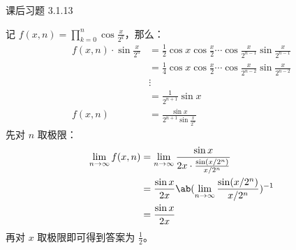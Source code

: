 \begin{problem}
	课后习题 3.1.13

	\begin{solution}
		记 $f(x,n) = \prod_{k=0}^n \cos \frac{x}{2^k}$，那么：
		$$
		\begin{aligned}
			f(x,n) \cdot \sin \frac{x}{2^n} & = \frac{1}{2} \cos x \cos \frac{x}{2} \cdots \cos \frac{x}{2^{n-1}} \sin \frac{x}{2^{n-1}} \\
			& = \frac{1}{4} \cos x \cos \frac{x}{2} \cdots \cos \frac{x}{2^{n-2}} \sin \frac{x}{2^{n-2}} \\
			& \vdots \\
			& = \frac{1}{2^{n+1}} \sin x \\
			f(x,n) & = \frac{\sin x}{2^{n+1} \sin \frac{x}{2^n}}
		\end{aligned}
		$$
		先对 $n$ 取极限：
		$$
		\begin{aligned}
			\lim_{n \to \infty} f(x,n) & = \lim_{n \to \infty} \frac{\sin x}{2x \cdot \frac{\sin (x / 2^n)}{x / 2^n}} \\
			& = \frac{\sin x}{2x} \ab(\lim_{n \to \infty} \frac{\sin (x / 2^n)}{x / 2^n})^{-1} \\
			& = \frac{\sin x}{2x}
		\end{aligned}
		$$
		再对 $x$ 取极限即可得到答案为 $\frac{1}{2}$。
	\end{solution}
\end{problem}